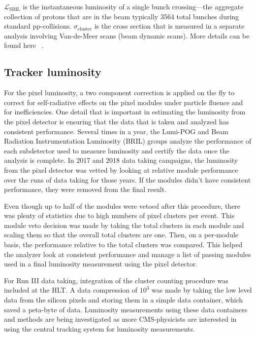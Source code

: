 $\mathcal{L}_{\text{SBIL}}$ is the instantaneous luminosity of a single bunch crossing---the aggregate collection of protons that are in the beam typically 3564 total bunches during standard pp-collisions. $\sigma_{\text{cluster}}$ is the cross section that is measured in a separate analysis involving Van-de-Meer scans (beam dynamic scans). More details can be found here ~\cite{Knolle:2792593}. 


\subsection{Tracker luminosity}
For the pixel luminosity, a two component correction is applied on the fly to correct for self-radiative effects on the pixel modules under particle fluence and for inefficiencies.  
One detail that is important in estimating the luminosity from the pixel detector is ensuring that the data that is taken and analyzed has consistent performance. Several times in a year, the Lumi-POG and Beam Radiation Instrumentation Luminosity (BRIL) groups analyze the performance of each subdetector used to measure luminosity and certify the data once the analysis is complete. In 2017 and 2018 data taking campaigns, the luminosity from the pixel detector was vetted by looking at relative module performance over the runs of data taking for those years. If the modules didn't have consistent performance, they were removed from the final result. 

Even though up to half of the modules were vetoed after this procedure, there was plenty of statistics due to high numbers of pixel clusters per event. 
This module veto decision was made by taking the total clusters in each module and scaling them so that the overall total clusters are one. Then, on a per-module basis, the performance relative to the total clusters was compared. This helped the analyzer look at consistent performance and manage a list of passing modules used in a final luminosity measurement using the pixel detector. 

For Run III data taking, integration of the cluster counting procedure was included at the HLT. A data compression of $10^3$ was made by taking the low level data from the silicon pixels and storing them in a simple data container, which saved a peta-byte of data. Luminosity measurements using these data containers and methods are being investigated as more CMS-physicists are interested in using the central tracking system for luminosity measurements.




